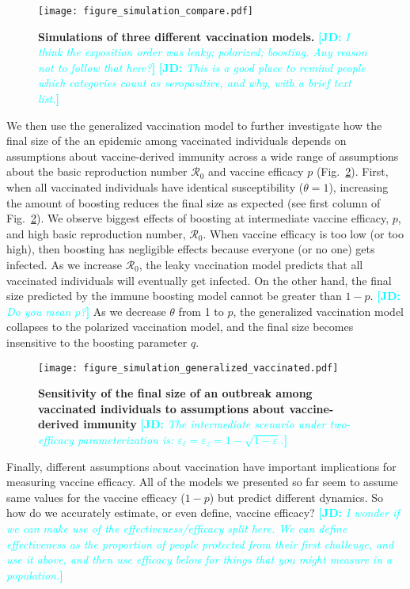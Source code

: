 \documentclass[12pt]{article}
\newcommand{\comment}{\showcomment}
\newcommand{\showcomment}[3]{\textcolor{#1}{\textbf{[#2: }\textsl{#3}\textbf{]}}}
\newcommand{\jd}[1]{\comment{cyan}{JD}{#1}}
\newcommand{\fref}[1]{Fig.~\ref{fig:#1}}
\begin{document}
\begin{figure}[!th]
\texttt{[image: figure\_simulation\_compare.pdf]}
\caption{
\textbf{Simulations of three different vaccination models.}
\jd{I think the exposition order was leaky; polarized; boosting. Any reason not to follow that here?}
\jd{This is a good place to remind people which categories count as seropositive, and why, with a brief text list.}
\label{fig:simulation}
}
\end{figure}

We then use the generalized vaccination model to further investigate how the final size of the an epidemic among vaccinated individuals depends on assumptions about vaccine-derived immunity across a wide range of assumptions about the basic reproduction number $\mathcal R_0$ and vaccine efficacy $p$ (\fref{sensitivity}).
First, when all vaccinated individuals have identical susceptibility ($\theta = 1$), increasing the amount of boosting reduces the final size as expected (see first column of \fref{sensitivity}).
We observe biggest effects of boosting at intermediate vaccine efficacy, $p$, and high basic reproduction number, $\mathcal R_0$.
When vaccine efficacy is too low (or too high), then boosting has negligible effects because everyone (or no one) gets infected.
As we increase $\mathcal R_0$, the leaky vaccination model predicts that all vaccinated individuals will eventually get infected.
On the other hand, the final size predicted by the immune boosting model cannot be greater than $1-p$. \jd{Do you mean $p$?}
As we decrease $\theta$ from 1 to $p$, the generalized vaccination model collapses to the polarized vaccination model, and the final size becomes insensitive to the boosting parameter $q$.

\begin{figure}[!th]
\texttt{[image: figure\_simulation\_generalized\_vaccinated.pdf]}
\caption{
\textbf{Sensitivity of the final size of an outbreak among vaccinated individuals to assumptions about vaccine-derived immunity}
\jd{The intermediate scenario under two-efficacy parameterization is: $\varepsilon_\ell = \varepsilon_z = 1 - \sqrt{1-\varepsilon}$.}
\label{fig:sensitivity}
}
\end{figure}

Finally, different assumptions about vaccination have important implications for measuring vaccine efficacy.
All of the models we presented so far seem to assume same values for the vaccine efficacy ($1-p$) but predict different dynamics. 
So how do we accurately estimate, or even define, vaccine efficacy?
\jd{I wonder if we can make use of the effectiveness/efficacy split here. We can define effectiveness as the proportion of people protected from their first challenge, and use it above, and then use efficacy below for things that you might measure in a population.}
\end{document}
